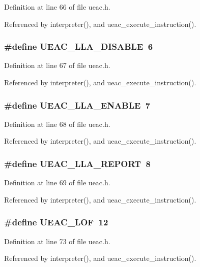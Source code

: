 Definition at line 66 of file ueac.h.

Referenced by interpreter(), and ueac\_\-execute\_\-instruction().
\subsubsection{\setlength{\rightskip}{0pt plus 5cm}\#define UEAC\_\-LLA\_\-DISABLE~6}\label{ueac_8h_a14}




Definition at line 67 of file ueac.h.

Referenced by interpreter(), and ueac\_\-execute\_\-instruction().
\subsubsection{\setlength{\rightskip}{0pt plus 5cm}\#define UEAC\_\-LLA\_\-ENABLE~7}\label{ueac_8h_a15}




Definition at line 68 of file ueac.h.

Referenced by interpreter(), and ueac\_\-execute\_\-instruction().
\subsubsection{\setlength{\rightskip}{0pt plus 5cm}\#define UEAC\_\-LLA\_\-REPORT~8}\label{ueac_8h_a16}




Definition at line 69 of file ueac.h.

Referenced by interpreter(), and ueac\_\-execute\_\-instruction().
\subsubsection{\setlength{\rightskip}{0pt plus 5cm}\#define UEAC\_\-LOF~12}\label{ueac_8h_a20}




Definition at line 73 of file ueac.h.

Referenced by interpreter(), and ueac\_\-execute\_\-instruction().
